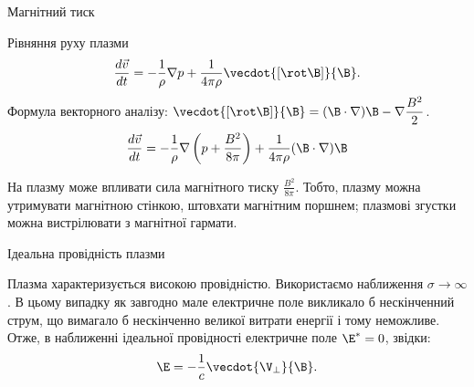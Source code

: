 \documentclass[]{beamer}
\begin{document}
\begin{frame}{Магнітний тиск}{}
	\begin{block}{}\justifying
		Рівняння руху плазми
		\begin{equation*}
			\frac{d\vec{v}}{d t}  = - \frac1\rho\nabla p + \frac1{4\pi\rho}
			\vecdot{\left[\rot\B\right]}{\B}.
		\end{equation*}
		Формула векторного аналізу: \(
		\vecdot{\left[\rot\B\right]}{\B} = (\B\cdot\nabla)\B - \nabla\dfrac{B^2}2
		\).
		\begin{equation*}
			\frac{d\vec{v}}{d t}  = - \frac1\rho\nabla\left( p + \frac{B^2}{8\pi}\right) +  \frac1{4\pi\rho}(\B\cdot\nabla)\B
		\end{equation*}

		На плазму може впливати сила магнітного тиску $ \frac{B^2}{8\pi} $. Тобто, плазму можна утримувати магнітною стінкою, штовхати магнітним поршнем; плазмові згустки можна вистрілювати з магнітної гармати.
	\end{block}
\end{frame}

\begin{frame}{Ідеальна провідність плазми}{}
	\begin{block}{}\justifying
		Плазма характеризується високою провідністю.
		Використаємо наближення $\sigma \to \infty$. В цьому випадку як завгодно мале електричне поле викликало б
		нескінченний струм, що вимагало б нескінченно великої витрати енергії і тому неможливе. Отже, в  наближенні ідеальної провідності електричне поле $\E^* = 0$, звідки:
		\begin{equation*}
			\E = -\frac1c \vecdot{\V_{\perp}}{\B}.
		\end{equation*}
	\end{block}
\end{frame}
\end{document}
